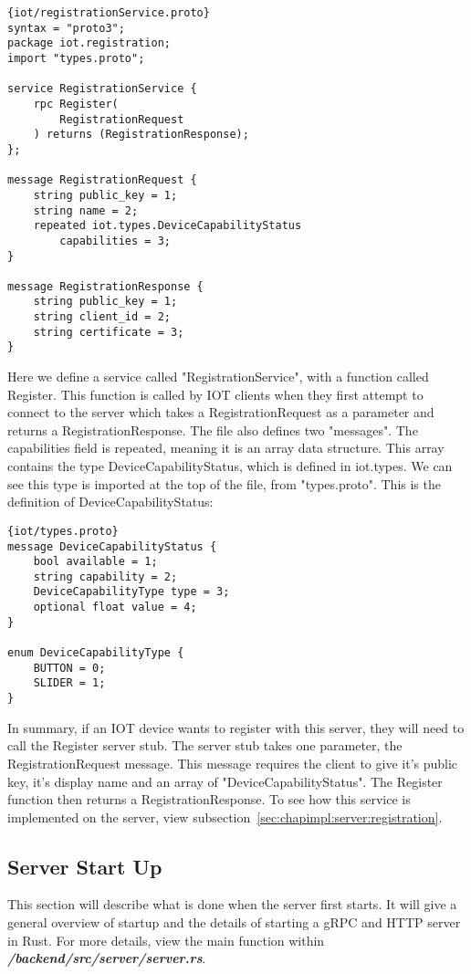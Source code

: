 \begin{lstlisting}[language=protobuf3, style=boxed]{iot/registrationService.proto}
syntax = "proto3";
package iot.registration;
import "types.proto";

service RegistrationService {
    rpc Register(
        RegistrationRequest
    ) returns (RegistrationResponse);
};

message RegistrationRequest {
    string public_key = 1;
    string name = 2;
    repeated iot.types.DeviceCapabilityStatus 
        capabilities = 3;
}

message RegistrationResponse {
    string public_key = 1;
    string client_id = 2;
    string certificate = 3;
}
\end{lstlisting}

Here we define a service called "RegistrationService", with a function called Register. This function is called by IOT clients when they first attempt to connect to the server which takes a RegistrationRequest as a parameter and returns a RegistrationResponse. The file also defines two "messages". The capabilities field is repeated, meaning it is an array data structure. This array contains the type DeviceCapabilityStatus, which is defined in iot.types. We can see this type is imported at the top of the file, from "types.proto". This is the definition of DeviceCapabilityStatus:

\begin{lstlisting}[language=protobuf3, style=boxed]{iot/types.proto}
message DeviceCapabilityStatus {
    bool available = 1;
    string capability = 2;
    DeviceCapabilityType type = 3;
    optional float value = 4;
}

enum DeviceCapabilityType {
    BUTTON = 0;
    SLIDER = 1;
}
\end{lstlisting}

In summary, if an IOT device wants to register with this server, they will need to call the Register server stub. The server stub takes one parameter, the RegistrationRequest message. This message requires the client to give it's public key, it's display name and an array of "DeviceCapabilityStatus". The Register function then returns a RegistrationResponse. To see how this service is implemented on the server, view subsection~\ref{sec:chapimpl:server:registration}.

\subsection{Server Start Up} \label{sec:chapimpl:server:startup}
This section will describe what is done when the server first starts. It will give a general overview of startup and the details of starting a gRPC and HTTP server in Rust. For more details, view the main function within \textit{\textbf{/backend/src/server/server.rs}}.

